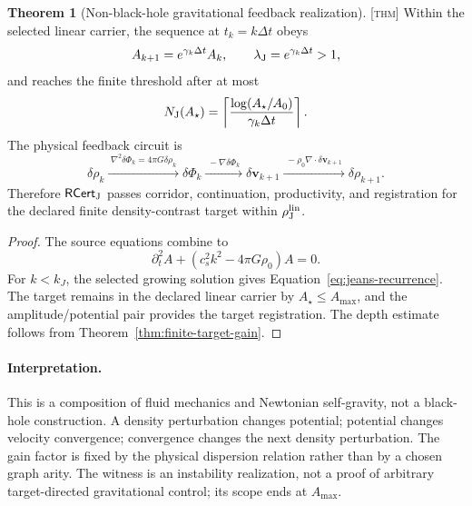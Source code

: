 \documentclass[11pt]{article}
\newcommand{\RCert}{\ensuremath{\mathsf{RCert}}}
\newcommand{\Thm}{\textsc{[thm]}}
\theoremstyle{definition}
\newtheorem{stheorem}[sdefinition]{Theorem}
\begin{document}
\begin{stheorem}[Non-black-hole gravitational feedback realization]
\label{thm:jeans-gain-realization}
\Thm{} Within the selected linear carrier, the sequence at
$t_k=k\Delta t$ obeys
\begin{equation}
A_{k+1}=e^{\gamma_k\Delta t}A_k,
\qquad \lambda_{\rm J}=e^{\gamma_k\Delta t}>1,
\label{eq:jeans-recurrence}
\end{equation}
and reaches the finite threshold after at most
\begin{equation}
N_{\rm J}(A_\star)=
\left\lceil\frac{\log(A_\star/A_0)}{\gamma_k\Delta t}\right\rceil.
\label{eq:jeans-target-depth}
\end{equation}
The physical feedback circuit is
\begin{equation}
\delta\rho_k
\xrightarrow{\;\nabla^2\delta\Phi_k=4\pi G\delta\rho_k\;}
\delta\Phi_k
\xrightarrow{\;-\nabla\delta\Phi_k\;}
\delta\mathbf v_{k+1}
\xrightarrow{\;-\rho_0\nabla\!\cdot\delta\mathbf v_{k+1}\;}
\delta\rho_{k+1}.
\label{eq:jeans-feedback-circuit}
\end{equation}
Therefore $\RCert_{\rm J}$ passes corridor, continuation, productivity, and
registration for the declared finite density-contrast target within
$\rho_{\rm J}^{\rm lin}$.
\end{stheorem}

\begin{proof}
The source equations combine to
\begin{equation}
\partial_t^2A+\left(c_s^2k^2-4\pi G\rho_0\right)A=0.
\label{eq:jeans-mode-equation}
\end{equation}
For $k<k_J$, the selected growing solution gives
Equation~\eqref{eq:jeans-recurrence}.  The target remains in the declared
linear carrier by $A_\star\le A_{\max}$, and the amplitude/potential pair
provides the target registration.  The depth estimate follows from
Theorem~\ref{thm:finite-target-gain}.
\end{proof}

\paragraph{Interpretation.}
This is a composition of fluid mechanics and Newtonian self-gravity, not a
black-hole construction.  A density perturbation changes potential; potential
changes velocity convergence; convergence changes the next density perturbation.
The gain factor is fixed by the physical dispersion relation rather than by a
chosen graph arity.  The witness is an instability realization, not a proof of
arbitrary target-directed gravitational control; its scope ends at $A_{\max}$.
\end{document}
